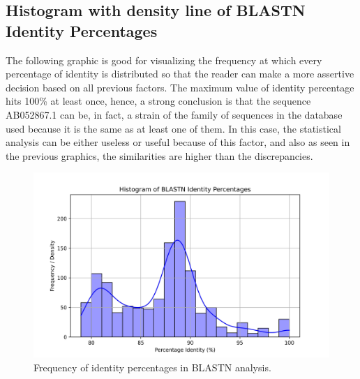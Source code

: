 \documentclass{article}%
\begin{document}
\subsection{Histogram with density line of BLASTN Identity Percentages}%
\label{subsec:HistogramwithdensitylineofBLASTNIdentityPercentages}%
The following graphic is good for visualizing the frequency at which every percentage of identity is distributed so that the reader can make a more assertive decision based on all previous factors.\newline%
\newline%
The maximum value of identity percentage hits 100\% at least once, hence, a strong conclusion is that the sequence AB052867.1 can be, in fact, a strain of the family of sequences in the database used because it is the same as at least one of them. \newline%
\newline%
In this case, the statistical analysis can be either useless or useful because of this factor, and also as seen in the previous graphics, the similarities are higher than the discrepancies. %


\begin{figure}[!htbp]%
\centering%
\includegraphics[width=1\textwidth]{hist_kde_pident.jpg}%
\caption{Frequency of identity percentages in BLASTN analysis.}%
\end{figure}

%
\end{document}
